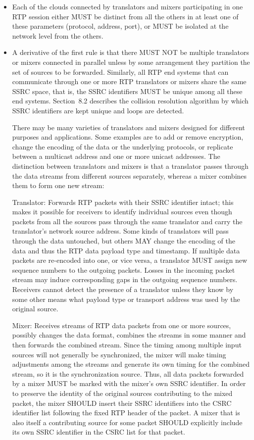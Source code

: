 \documentclass{article}
\begin{document}
\begin{itemize}
\item Each of the clouds connected by translators and mixers participating in one RTP session either MUST be distinct from all the others in at least one of these parameters (protocol, address, port), or MUST be isolated at the network level from the others.
\item A derivative of the first rule is that there MUST NOT be multiple translators or mixers connected in parallel unless by some arrangement they partition the set of sources to be forwarded.
Similarly, all RTP end systems that can communicate through one or more RTP translators or mixers share the same SSRC space, that is, the SSRC identifiers MUST be unique among all these end systems. Section~8.2 describes the collision resolution algorithm by which SSRC identifiers are kept unique and loops are detected.

There may be many varieties of translators and mixers designed for different purposes and applications.  Some examples are to add or remove encryption, change the encoding of the data or the underlying protocols, or replicate between a multicast address and one or more unicast addresses.  The distinction between translators and mixers is that a translator passes through the data streams from different sources separately, whereas a mixer combines them to form one new stream:

Translator: Forwards RTP packets with their SSRC identifier intact; this makes it possible for receivers to identify individual sources even though packets from all the sources pass through the same translator and carry the translator's network source address.  Some kinds of translators will pass through the data untouched, but others MAY change the encoding of the data and thus the RTP data payload type and timestamp.  If multiple data packets are re-encoded into one, or vice versa, a translator MUST assign new sequence numbers to the outgoing packets.  Losses in the incoming packet stream may induce corresponding gaps in the outgoing sequence numbers.  Receivers cannot detect the presence of a translator unless they know by some other means what payload type or transport address was used by the original source.

Mixer: Receives streams of RTP data packets from one or more sources, possibly changes the data format, combines the streams in some manner and then forwards the combined stream.  Since the timing among multiple input sources will not generally be synchronized, the mixer will make timing adjustments among the streams and generate its own timing for the combined stream, so it is the synchronization source.  Thus, all data packets forwarded by a mixer MUST be marked with the mixer's own SSRC identifier. In order to preserve the identity of the original sources contributing to the mixed packet, the mixer SHOULD insert their SSRC identifiers into the CSRC identifier list following the fixed RTP header of the packet.  A mixer that is also itself a contributing source for some packet SHOULD explicitly include its own SSRC identifier in the CSRC list for that packet.


\end{itemize}
\end{document}
